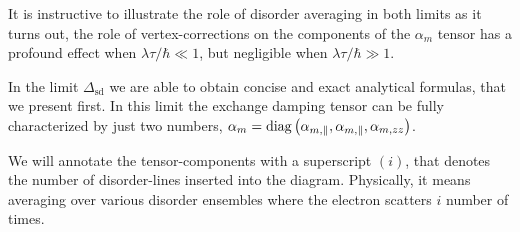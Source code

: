 It is instructive to illustrate the role of disorder averaging in both limits as it turns out, the role of vertex-corrections on the components of the $\alpha_m$ tensor has a profound effect when $\lambda\tau/\hbar\ll1$, but negligible when $\lambda\tau/\hbar\gg1$. 

In the limit $\Delta_\text{sd}$ we are able to obtain concise and exact analytical formulas, that we present first. In this limit the exchange damping tensor can be fully characterized by just two numbers, $\alpha_m=\operatorname{diag}\left(\alpha_{m,\parallel}, \alpha_{m,\parallel}, \alpha_{m,zz}\right)$.

We will annotate the tensor-components with a superscript $(i)$, that denotes the number of disorder-lines inserted into the diagram. Physically, it means averaging over various disorder ensembles where the electron scatters $i$ number of times. 


